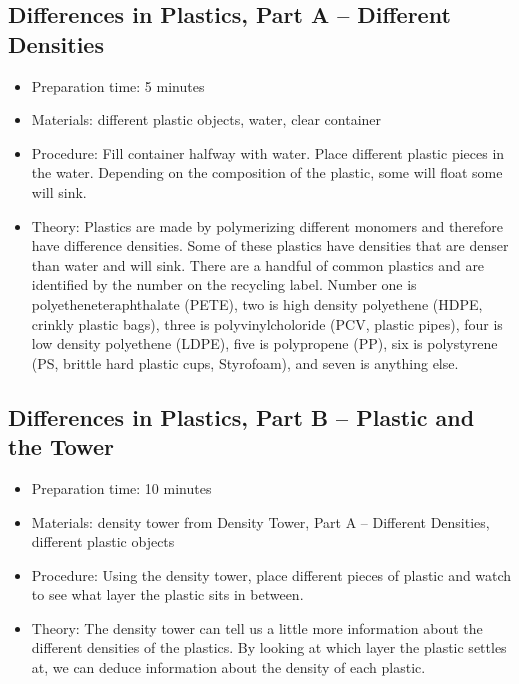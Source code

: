 \subsection{Differences in Plastics, Part A – Different Densities}
\begin{itemize}
\item{Preparation time: 5 minutes}
\item{Materials: different plastic objects, water, clear container}
\item{Procedure: Fill container halfway with water. Place different plastic pieces in the water. Depending on the composition of the plastic, some will float some will sink. }
\item{Theory: Plastics are made by polymerizing different monomers and therefore have difference densities. Some of these plastics have densities that are denser than water and will sink. There are a handful of common plastics and are identified by the number on the recycling label. Number one is polyetheneteraphthalate (PETE), two is high density polyethene (HDPE, crinkly plastic bags), three is polyvinylcholoride (PCV, plastic pipes), four is low density polyethene (LDPE), five is polypropene (PP), six is polystyrene (PS, brittle hard plastic cups, Styrofoam), and seven is anything else. }
\end{itemize}

\subsection{Differences in Plastics, Part B – Plastic and the Tower}
\begin{itemize}
\item{Preparation time: 10 minutes}
\item{Materials: density tower from Density Tower, Part A – Different Densities, different plastic objects}
\item{Procedure: Using the density tower, place different pieces of plastic and watch to see what layer the plastic sits in between.}
\item{Theory: The density tower can tell us a little more information about the different densities of the plastics. By looking at which layer the plastic settles at, we can deduce information about the density of each plastic.}
\end{itemize}

